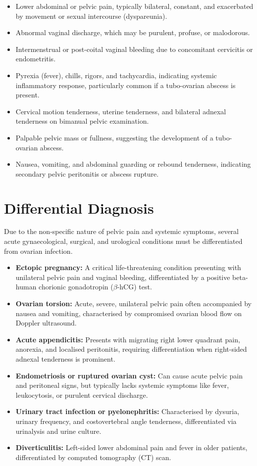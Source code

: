 \begin{itemize}
    \item Lower abdominal or pelvic pain, typically bilateral, constant, and exacerbated by movement or sexual intercourse (dyspareunia).
    \item Abnormal vaginal discharge, which may be purulent, profuse, or malodorous.
    \item Intermenstrual or post-coital vaginal bleeding due to concomitant cervicitis or endometritis.
    \item Pyrexia (fever), chills, rigors, and tachycardia, indicating systemic inflammatory response, particularly common if a tubo-ovarian abscess is present.
    \item Cervical motion tenderness, uterine tenderness, and bilateral adnexal tenderness on bimanual pelvic examination.
    \item Palpable pelvic mass or fullness, suggesting the development of a tubo-ovarian abscess.
    \item Nausea, vomiting, and abdominal guarding or rebound tenderness, indicating secondary pelvic peritonitis or abscess rupture.
\end{itemize}

\section*{Differential Diagnosis}
Due to the non-specific nature of pelvic pain and systemic symptoms, several acute gynaecological, surgical, and urological conditions must be differentiated from ovarian infection.

\begin{itemize}
    \item \textbf{Ectopic pregnancy:} A critical life-threatening condition presenting with unilateral pelvic pain and vaginal bleeding, differentiated by a positive beta-human chorionic gonadotropin ($\beta$-hCG) test.
    \item \textbf{Ovarian torsion:} Acute, severe, unilateral pelvic pain often accompanied by nausea and vomiting, characterised by compromised ovarian blood flow on Doppler ultrasound.
    \item \textbf{Acute appendicitis:} Presents with migrating right lower quadrant pain, anorexia, and localised peritonitis, requiring differentiation when right-sided adnexal tenderness is prominent.
    \item \textbf{Endometriosis or ruptured ovarian cyst:} Can cause acute pelvic pain and peritoneal signs, but typically lacks systemic symptoms like fever, leukocytosis, or purulent cervical discharge.
    \item \textbf{Urinary tract infection or pyelonephritis:} Characterised by dysuria, urinary frequency, and costovertebral angle tenderness, differentiated via urinalysis and urine culture.
    \item \textbf{Diverticulitis:} Left-sided lower abdominal pain and fever in older patients, differentiated by computed tomography (CT) scan.
\end{itemize}

